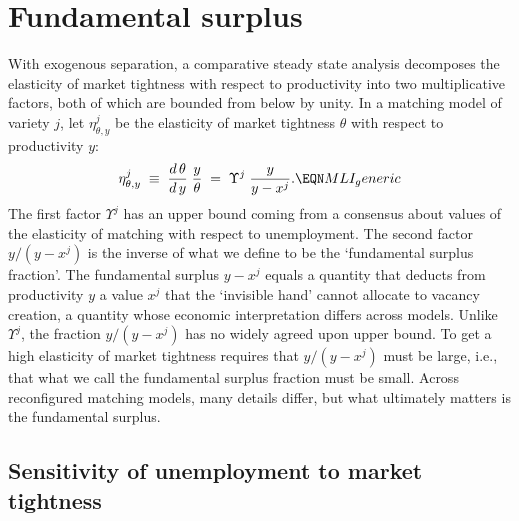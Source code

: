 \section{Fundamental surplus}
%
With exogenous separation,  a comparative steady state analysis decomposes  the elasticity of market tightness with respect to productivity into
two multiplicative factors,  both of which are bounded from below by unity.
In a matching model  of variety $j$, let $\eta^j_{\theta,y}$ be the elasticity of
market tightness $\theta$ with respect to productivity $y$:
$$
 \eta^j_{\theta,y}
\;\equiv\; {d\, \theta \over d\, y} \; {y \over \theta}
\;=\; \Upsilon^j \; \frac{y}{y-x^j} .    \EQN MLI_generic
$$
The first factor $\Upsilon^j$  has  an   upper bound
coming  from a consensus  about values of the elasticity
of matching with respect to unemployment. The second factor
$y/(y-x^j)$ is the inverse of what we  define to be   the
`fundamental surplus fraction'. The fundamental surplus $y-x^j$ equals a quantity that  deducts from productivity $y$ a
value $x^j$ that the `invisible hand' cannot allocate to
vacancy creation, a quantity whose economic interpretation differs across models.  Unlike $\Upsilon^j$, the fraction $y/(y-x^j)$ has no
widely agreed upon upper bound.
To get a high elasticity of market
tightness requires that $y/(y-x^j)$ must  be large, i.e., that  what we call the
fundamental surplus fraction must be small.
 Across reconfigured matching models, many details
differ, but
what ultimately matters is the fundamental surplus.


\subsection{Sensitivity of unemployment to market tightness}

